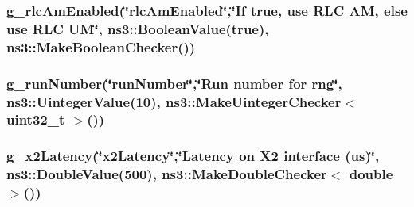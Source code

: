 \subsubsection[{\texorpdfstring{g\+\_\+rlc\+Am\+Enabled}{g_rlcAmEnabled}}]{ g\+\_\+rlc\+Am\+Enabled(\char`\"{}rlc\+Am\+Enabled\char`\"{},\char`\"{}If true, use R\+LC AM, else use R\+LC UM\char`\"{}, ns3\+::\+Boolean\+Value(true), ns3\+::\+Make\+Boolean\+Checker())\hspace{0.3cm}{\ttfamily [static]}}\hypertarget{mc-twoenbs_8cc_ad58c0bca4940ad128156370612451147}{}\label{mc-twoenbs_8cc_ad58c0bca4940ad128156370612451147}
\subsubsection[{\texorpdfstring{g\+\_\+run\+Number}{g_runNumber}}]{ g\+\_\+run\+Number(\char`\"{}run\+Number\char`\"{},\char`\"{}Run number for rng\char`\"{}, ns3\+::\+Uinteger\+Value(10), {\bf ns3\+::\+Make\+Uinteger\+Checker}$<$ uint32\+\_\+t $>$())\hspace{0.3cm}{\ttfamily [static]}}\hypertarget{mc-twoenbs_8cc_a64b48b780fb569c9c226fe3a9d8fefda}{}\label{mc-twoenbs_8cc_a64b48b780fb569c9c226fe3a9d8fefda}
\subsubsection[{\texorpdfstring{g\+\_\+x2\+Latency}{g_x2Latency}}]{ g\+\_\+x2\+Latency(\char`\"{}x2\+Latency\char`\"{},\char`\"{}Latency {\bf on} X2 interface (us)\char`\"{}, ns3\+::\+Double\+Value(500), {\bf ns3\+::\+Make\+Double\+Checker}$<$ double $>$())\hspace{0.3cm}{\ttfamily [static]}}\hypertarget{mc-twoenbs_8cc_a6bef83702297af986c679ca3d5c220aa}{}\label{mc-twoenbs_8cc_a6bef83702297af986c679ca3d5c220aa}
